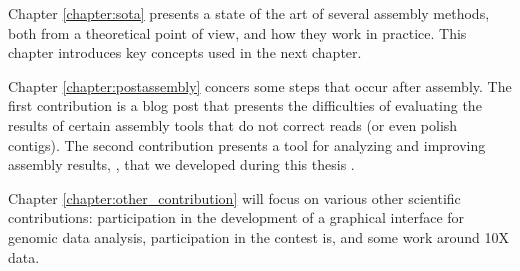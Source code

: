 \documentclass[./main.tex]{subfiles}
\begin{document}
Chapter \ref{chapter:sota} presents a state of the art of several assembly methods, both from a theoretical point of view, and how they work in practice. This chapter introduces key concepts used in the next chapter.

Chapter \ref{chapter:postassembly} concers some steps that occur after assembly. The first contribution is a blog post that presents the difficulties of evaluating the results of certain assembly tools that do not correct reads (or even polish contigs). The second contribution presents a tool for analyzing and improving assembly results, \knot, that we developed during this thesis \cite{knot}.

Chapter \ref{chapter:other_contribution} will focus on various other scientific contributions: participation in the development of a graphical interface for genomic data analysis, participation in the contest is, and some work around 10X data.

\end{document}
